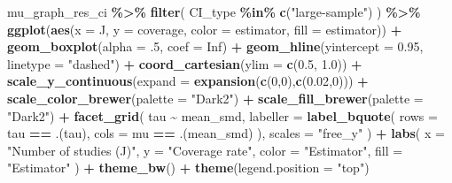 \documentclass[
]{article}
\newenvironment{Shaded}{\begin{snugshade}}{\end{snugshade}}
\newcommand{\AttributeTok}[1]{\textcolor[rgb]{0.13,0.29,0.53}{#1}}
\newcommand{\ConstantTok}[1]{\textcolor[rgb]{0.56,0.35,0.01}{#1}}
\newcommand{\DecValTok}[1]{\textcolor[rgb]{0.00,0.00,0.81}{#1}}
\newcommand{\FloatTok}[1]{\textcolor[rgb]{0.00,0.00,0.81}{#1}}
\newcommand{\FunctionTok}[1]{\textcolor[rgb]{0.13,0.29,0.53}{\textbf{#1}}}
\newcommand{\NormalTok}[1]{#1}
\newcommand{\SpecialCharTok}[1]{\textcolor[rgb]{0.81,0.36,0.00}{\textbf{#1}}}
\newcommand{\StringTok}[1]{\textcolor[rgb]{0.31,0.60,0.02}{#1}}
\begin{document}
\begin{Shaded}
\begin{Highlighting}[]
\NormalTok{mu\_graph\_res\_ci }\SpecialCharTok{\%\textgreater{}\%}
  \FunctionTok{filter}\NormalTok{(}
\NormalTok{    CI\_type }\SpecialCharTok{\%in\%} \FunctionTok{c}\NormalTok{(}\StringTok{"large{-}sample"}\NormalTok{)}
\NormalTok{  ) }\SpecialCharTok{\%\textgreater{}\%}
  \FunctionTok{ggplot}\NormalTok{(}\FunctionTok{aes}\NormalTok{(}\AttributeTok{x =}\NormalTok{ J, }\AttributeTok{y =}\NormalTok{ coverage, }\AttributeTok{color =}\NormalTok{ estimator, }\AttributeTok{fill =}\NormalTok{ estimator)) }\SpecialCharTok{+}
  \FunctionTok{geom\_boxplot}\NormalTok{(}\AttributeTok{alpha =}\NormalTok{ .}\DecValTok{5}\NormalTok{, }\AttributeTok{coef =} \ConstantTok{Inf}\NormalTok{) }\SpecialCharTok{+}
  \FunctionTok{geom\_hline}\NormalTok{(}\AttributeTok{yintercept =} \FloatTok{0.95}\NormalTok{, }\AttributeTok{linetype =} \StringTok{"dashed"}\NormalTok{) }\SpecialCharTok{+}
  \FunctionTok{coord\_cartesian}\NormalTok{(}\AttributeTok{ylim =} \FunctionTok{c}\NormalTok{(}\FloatTok{0.5}\NormalTok{, }\FloatTok{1.0}\NormalTok{)) }\SpecialCharTok{+} 
  \FunctionTok{scale\_y\_continuous}\NormalTok{(}\AttributeTok{expand =} \FunctionTok{expansion}\NormalTok{(}\FunctionTok{c}\NormalTok{(}\DecValTok{0}\NormalTok{,}\DecValTok{0}\NormalTok{),}\FunctionTok{c}\NormalTok{(}\FloatTok{0.02}\NormalTok{,}\DecValTok{0}\NormalTok{))) }\SpecialCharTok{+} 
  \FunctionTok{scale\_color\_brewer}\NormalTok{(}\AttributeTok{palette =} \StringTok{"Dark2"}\NormalTok{) }\SpecialCharTok{+}
  \FunctionTok{scale\_fill\_brewer}\NormalTok{(}\AttributeTok{palette =} \StringTok{"Dark2"}\NormalTok{) }\SpecialCharTok{+}
  \FunctionTok{facet\_grid}\NormalTok{(}
\NormalTok{    tau }\SpecialCharTok{\textasciitilde{}}\NormalTok{ mean\_smd, }
    \AttributeTok{labeller =} \FunctionTok{label\_bquote}\NormalTok{(}
      \AttributeTok{rows =}\NormalTok{ tau }\SpecialCharTok{==}\NormalTok{ .(tau),}
      \AttributeTok{cols =}\NormalTok{ mu }\SpecialCharTok{==}\NormalTok{ .(mean\_smd)}
\NormalTok{    ),}
    \AttributeTok{scales =} \StringTok{"free\_y"}
\NormalTok{  ) }\SpecialCharTok{+}
  \FunctionTok{labs}\NormalTok{(}
    \AttributeTok{x =} \StringTok{"Number of studies (J)"}\NormalTok{, }
    \AttributeTok{y =} \StringTok{"Coverage rate"}\NormalTok{, }
    \AttributeTok{color =} \StringTok{"Estimator"}\NormalTok{,}
    \AttributeTok{fill =} \StringTok{"Estimator"}
\NormalTok{  ) }\SpecialCharTok{+} 
  \FunctionTok{theme\_bw}\NormalTok{() }\SpecialCharTok{+}
  \FunctionTok{theme}\NormalTok{(}\AttributeTok{legend.position =} \StringTok{"top"}\NormalTok{)}
\end{Highlighting}
\end{Shaded}
\end{document}
